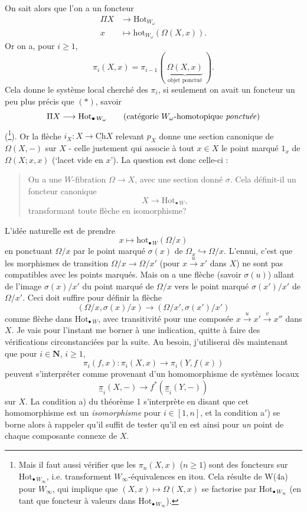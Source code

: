 \documentclass[11pt]{article}
\newcommand{\printedpage}[1]{\marginpar{\footnotesize p.~#1}}
\newcommand{\msp}[1]{\marginpar{\footnotesize [#1]}}
\newcommand{\Ch}{\underline{\mathrm{Ch}}}
\newcommand{\Hotp}[1]{\mathrm{Hot}_{\bullet\,#1}}
\newcommand{\hotp}[1]{\mathrm{hot}_{\bullet\,#1}}
\newcommand{\utpi}{\underset{\sim}{\pi}}
\begin{document}
On sait alors que l'on a un foncteur
\[
\begin{aligned}
\Pi X &\longrightarrow \mathrm{Hot}_{W_\omega}\\
x &\longmapsto \mathrm{hot}_{W_\omega}(\Omega(X,x)).
\end{aligned}
\tag*{$(*)$}
\]
Or on a, pour $i \geq 1$,
\[
\pi_i(X,x) = \pi_{i-1}(\ \underbrace{\Omega(X,x)}_{\text{objet ponctué}}\ ).
\]
Cela donne le système local cherché des $\pi_i$, si seulement on avait un foncteur un peu plus précis que $(*)$, savoir
\[
\Pi X \longrightarrow \Hotp{W_\omega} \qquad \text{(catégorie $W_\omega$-homotopique \textit{ponctuée})}
\]
(\footnote[114]{Mais il faut aussi vérifier que les $\pi_n(X,x)$ ($n \geq 1$) sont des foncteurs sur $\Hotp{W_\infty}$, i.e. transforment $W_\infty$-équivalences en itou. Cela résulte de W(4a) pour $W_\infty$, qui implique que $(X,x) \mapsto \Omega(X,x)$ se factorise par $\Hotp{W_\infty}$ (en tant que foncteur à valeurs dans $\Hotp{W_\infty}$).}). Or la flèche $i_X : X \longrightarrow \Ch X$ relevant $p_X$ donne une section canonique de $\Omega(X,-)$ sur $X$ -
\msp{page 174}
celle justement qui associe à tout $x \in X$ le point marqué $1_x$ de $\Omega(X;x,x)$ (`lacet vide en $x$'). La question est donc celle-ci :

\begin{quote}
On a une $W$-fibration $\Omega \longrightarrow X$, avec une section donné $\sigma$. Cela définit-il un foncteur canonique %
\[
X \longrightarrow \Hotp{W},
\]
transformant toute flèche en isomorphisme?
\end{quote}

L'idée naturelle est de prendre
\[
x \longmapsto \hotp{W}(\Omega/x)
\]
en ponctuant $\Omega/x$ par le point marqué $\sigma(x)$ de $\Omega_x \hookrightarrow \Omega/x$. L'ennui, c'est que les morphismes de transition $\Omega/x \longrightarrow \Omega/x'$ (pour $x \xrightarrow{u} x'$ dans $X$) ne sont pas compatibles avec les points marqués. Mais on a une flèche (savoir $\sigma(u)$) allant
\msp{page 175}
de l'image $\sigma(x)/x'$ du point marqué de $\Omega/x$ vers le point marqué $\sigma(x')/x'$ de $\Omega/x'$. Ceci doit suffire pour définir la flèche
\[
(\Omega/x,\sigma(x)/x) \longrightarrow (\Omega/x',\sigma(x')/x')
\]
comme flèche dans $\Hotp{W}$, avec transitivité pour une composée $x \xrightarrow{u} x' \xrightarrow{v} x''$ dans $X$. Je vais pour l'instant me borner
\printedpage{118}
\msp{page 176}
à une indication, quitte à faire des vérifications circonstanciées par la suite. Au besoin, j'utiliserai dès maintenant que pour $i \in \mathbf{N}$, $i \geq 1$,
\[
\pi_i(f,x) : \pi_i(X,x) \longrightarrow \pi_i(Y,f(x))
\]
peuvent s'interpréter comme provenant d'un homomorphisme de systèmes locaux
\[
\utpi_i(X,-) \longrightarrow f^*(\utpi_i(Y,-))
\]
sur $X$. La condition a) du théorème 1 s'interprète en disant que cet homomorphisme est un \textit{isomorphisme} pour $i \in [1,n]$, et la condition a$'$) se borne alors à rappeler qu'il suffit de tester qu'il en est ainsi pour \textit{un} point de chaque composante connexe de $X$.
\end{document}
